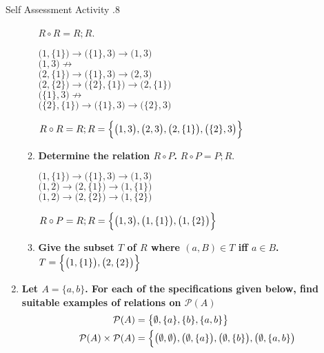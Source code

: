 \documentclass[../notes.tex]{subfiles}
\begin{document}
\begin{exercise}{Self Assessment Activity \thechapter.8}
\begin{enumerate}
\begin{enumerate}[label=(\alph*)]
									$R \circ R = R; R$.
									\begin{indentparagraph}
										$\bigl(1, \{1\}\bigr) \rightarrow \bigl(\{1\}, 3\bigr) \rightarrow \bigl(1, 3\bigr)$\\
										$\bigl(1, 3\bigr) \not \rightarrow$\\
										$\bigl(2, \{1\}\bigr) \rightarrow \bigl(\{1\}, 3\bigr) \rightarrow \bigl(2, 3\bigr)$\\
										$\bigl(2, \{2\}\bigr) \rightarrow \bigl(\{2\}, \{1\}\bigr) \rightarrow \bigl(2, \{1\}\bigr)$\\
										$\bigl(\{1\}, 3\bigr) \not \rightarrow$\\
										$\bigl(\{2\}, \{1\}\bigr) \rightarrow \bigl(\{1\}, 3\bigr) \rightarrow \bigl(\{2\}, 3\bigr)$
									\end{indentparagraph}
									$R \circ R = R; R = \Bigl\{\bigl(1, 3\bigr), \bigl(2, 3\bigr), \bigl(2, \{1\}\bigr), \bigl(\{2\}, 3\bigr)\Bigr\}$
								\item \textbf{Determine the relation $R \circ P$.}
									$R \circ P = P;R$.
									\begin{indentparagraph}
										$\bigl(1, \{1\}\bigr) \rightarrow \bigl(\{1\}, 3\bigr) \rightarrow \bigl(1, 3\bigr)$\\
										$\bigl(1, 2\bigr) \rightarrow \bigl(2, \{1\}\bigr) \rightarrow \bigl(1, \{1\}\bigr)$\\
										$\bigl(1, 2\bigr) \rightarrow \bigl(2, \{2\}\bigr) \rightarrow \bigl(1, \{2\}\bigr)$
									\end{indentparagraph}
									$R \circ P = R;R = \Bigl\{\bigl(1, 3\bigr), \bigl(1, \{1\}\bigr), \bigl(1, \{2\}\bigr)\Bigr\}$
								\item \textbf{Give the subset $T$ of $R$ where $(a, B) \in T$ iff $a \in B$.}\\
									$T = \Bigl\{\bigl(1, \{1\}\bigr), \bigl(2, \{2\}\bigr)\Bigr\}$
							\end{enumerate}
						\pagebreak
						\item \textbf{Let $A = \{a, b\}$. For each of the specifications given below, find suitable examples of relations on $\mathcal{P}(A)$}
							\begin{align*}
								\mathcal{P}(A) &= \bigl\{\emptyset, \{a\}, \{b\}, \{a, b\}\bigr\}\\
								\mathcal{P}(A) \times \mathcal{P}(A) &= \Bigl\{
									\bigl(\emptyset, \emptyset\bigr), \bigl(\emptyset, \{a\}\bigr), \bigl(\emptyset, \{b\}\bigr), \bigl(\emptyset, \{a, b\}\bigr)\\

\end{align*}
\end{enumerate}
\end{exercise}
\end{document}
